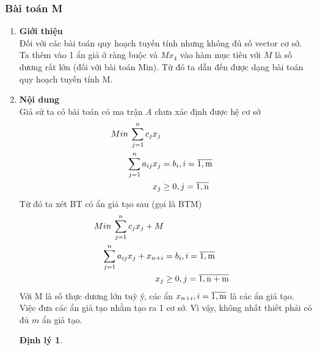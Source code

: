 \documentclass{article}
\newtheorem{dl}{Định lý}
\begin{document}
            \subsubsection{Bài toán M}
                \begin{enumerate}
                    \item \textbf{Giới thiệu} \\
                        Đối với các bài toán quy hoạch tuyến tính nhưng không đủ số vector cơ sở. Ta thêm vào 1 ẩn giả ở ràng buộc và $Mx_4$ vào hàm mục tiêu với $M$ là số dương rất lớn (đối với bài toán Min). Từ đó ta dẫn đến được dạng bài toán quy hoạch tuyến tính M.
                    \item \textbf{Nội dung} \\
                        Giả sử ta có bài toán có ma trận $A$ chưa xác định được hệ cơ sở
                            \begin{equation} \label{*}
                                \begin{split}
                                    Min \: \sum_{j=1}^n c_jx_j \\
                                    \sum_{j=1}^n a_{ij}x_j&=b_i , i = \overline{\rm 1,m} \\
                                    x_j &\geq 0 , j = \overline{\rm 1,n} \\
                                \end{split}
                            \end{equation}
                        Từ đó ta xét BT có ẩn giả tạo sau (gọi là BTM)
                            \begin{equation} \label{**}
                                \begin{split}
                                    Min \: \sum_{j=1}^n c_jx_j+M \\
                                    \sum_{j=1}^n a_{ij}x_j + x_{n+i}&=b_i , i = \overline{\rm 1,m} \\
                                    x_j &\geq 0 , j= \overline{\rm 1,{n+m}}
                                \end{split}
                            \end{equation}
                        Với M là số thực dương lớn tuỳ ý, các ẩn $x_{n+i} , i=\overline{\rm 1,m}$ là các ẩn giả tạo. Việc đưa các ẩn giả tạo nhằm tạo ra 1 cơ sở. Vì vậy, không nhất thiết phải có đủ $m$ ẩn giả tạo.
                            \begin{dl}

\end{dl}
\end{enumerate}
\end{document}
